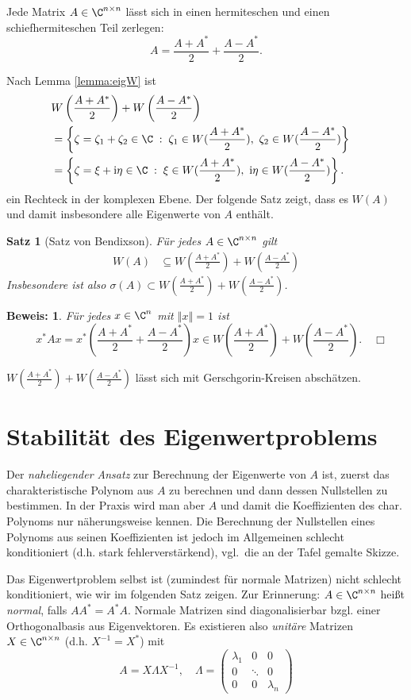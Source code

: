 \documentclass[
]{mycourse}
\theoremstyle{mythm}
\newtheorem{theorem}{Satz}[chapter]
\theoremstyle{break}
\newtheorem*{beweis}{Beweis:}
\newcommand{\norm}[1]{\left\Vert#1\right\Vert}		%
\renewcommand{\im}{\ensuremath{\mathrm{i}}} 			      	%
\newcommand{\dd}{\; : \;}    			      	%
\begin{document}
Jede Matrix $A\in \C^{n\times n}$ lässt sich in einen hermiteschen und einen schiefhermiteschen Teil zerlegen:
\[
A=\frac{A+A^*}{2}+\frac{A-A^*}{2}.
\]

Nach Lemma \ref{lemma:eigW} ist
\begin{align*}
\lefteqn{W \left(\frac{A+A^*}{2}\right)+W\left(\frac{A-A^*}{2}\right)}\\
&=\left\{ \zeta=\zeta_1+\zeta_2\in \C \dd \zeta_1\in W(\frac{A+A^*}{2}),\ \zeta_2\in W(\frac{A-A^*}{2}) \right\}\\
&=\left\{ \zeta=\xi + \im \eta\in \C \dd \xi \in W(\frac{A+A^*}{2}),\ \im \eta \in W(\frac{A-A^*}{2}) \right\}.\\
\end{align*}
ein Rechteck in der komplexen Ebene. Der folgende Satz zeigt, dass es $W(A)$ und damit insbesondere alle Eigenwerte von $A$ enthält.

\begin{theorem}[Satz von Bendixson]
Für jedes $A\in \C^{n\times n}$ gilt
\begin{align*}
W(A)& \subseteq W(\frac{A+A^*}{2})+W(\frac{A-A^*}{2})
\end{align*}
Insbesondere ist also $\sigma(A)\subset  W(\frac{A+A^*}{2})+W(\frac{A-A^*}{2})$.
\end{theorem}
\begin{beweis}
Für jedes $x\in \C^n$ mit $\norm{x}=1$ ist
\[
\quad x^* A x=x^* \left( \frac{A+A^*}{2}+\frac{A-A^*}{2}\right) x\in W(\frac{A+A^*}{2})+W(\frac{A-A^*}{2}). \quad \Box
\]
\end{beweis}

$W(\frac{A+A^*}{2})+W(\frac{A-A^*}{2})$ lässt sich mit Gerschgorin-Kreisen abschätzen.




\section{Stabilität des Eigenwertproblems}

Der \emph{naheliegender Ansatz} zur Berechnung der Eigenwerte von $A$ ist, zuerst das charakteristische Polynom aus $A$ zu berechnen und dann dessen Nullstellen zu bestimmen. In der Praxis wird man aber $A$ und damit die Koeffizienten des char. Polynoms nur näherungsweise kennen. Die Berechnung der Nullstellen eines Polynoms aus seinen Koeffizienten ist jedoch im Allgemeinen schlecht konditioniert (d.h. stark fehlerverstärkend), vgl.\ die an der Tafel gemalte Skizze.

Das Eigenwertproblem selbst ist (zumindest für normale Matrizen) nicht schlecht konditioniert, wie wir im folgenden Satz zeigen.
Zur Erinnerung: $A\in \C^{n\times n}$ heißt \emph{normal}, falls $AA^*=A^*A$. Normale Matrizen sind diagonalisierbar bzgl. einer Orthogonalbasis
aus Eigenvektoren. Es existieren also \emph{unitäre} Matrizen $X\in \C^{n\times n}$ (d.h. $X^{-1}=X^*$) mit 
\[
A=X \Lambda X^{-1}, \quad \Lambda=\begin{pmatrix} \lambda_1 & 0 & 0\\ 0 & \ddots & 0\\ 0 & 0 & \lambda_n\end{pmatrix}
\]
\end{document}
